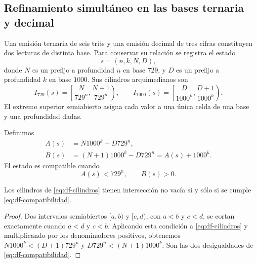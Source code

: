 \subsection{Refinamiento simultáneo en las bases ternaria y decimal}
\label{subsec:df-cilindros-mixtos}


Una emisión ternaria de seis trits y una emisión decimal de tres cifras
constituyen dos lecturas de distinta base. Para conservar su relación se
registra el estado
\[
 s=(n,k,N,D),
\]
donde \(N\) es un prefijo a profundidad \(n\) en base \(729\), y \(D\) es
un prefijo a profundidad \(k\) en base \(1000\). Sus cilindros
arquimedianos son
\begin{equation}
 I_{729}(s)=\left[\frac{N}{729^n},\frac{N+1}{729^n}\right),\qquad
 I_{1000}(s)=\left[\frac{D}{1000^k},\frac{D+1}{1000^k}\right).
 \label{eq:df-cilindros}
\end{equation}
El extremo superior semiabierto asigna cada valor a una única celda de una
base y una profundidad dadas.

\begin{definition}
Definimos
\begin{align}
 A(s)&=N1000^k-D729^n,\label{eq:df-defecto-inferior}\\
 B(s)&=(N+1)1000^k-D729^n=A(s)+1000^k.
 \label{eq:df-defecto-superior}
\end{align}
El estado es compatible cuando
\begin{equation}
 A(s)<729^n,\qquad B(s)>0.
 \label{eq:df-compatibilidad}
\end{equation}
\end{definition}

\begin{lemma}
Los cilindros de \eqref{eq:df-cilindros} tienen intersección no vacía si y
sólo si se cumple \eqref{eq:df-compatibilidad}.
\end{lemma}

\begin{proof}
Dos intervalos semiabiertos \([a,b)\) y \([c,d)\), con \(a<b\) y
\(c<d\), se cortan exactamente cuando \(a<d\) y \(c<b\). Aplicando esta
condición a \eqref{eq:df-cilindros} y multiplicando por los denominadores
positivos, obtenemos
\(N1000^k<(D+1)729^n\) y
\(D729^n<(N+1)1000^k\). Son las dos desigualdades de
\eqref{eq:df-compatibilidad}.
\end{proof}

